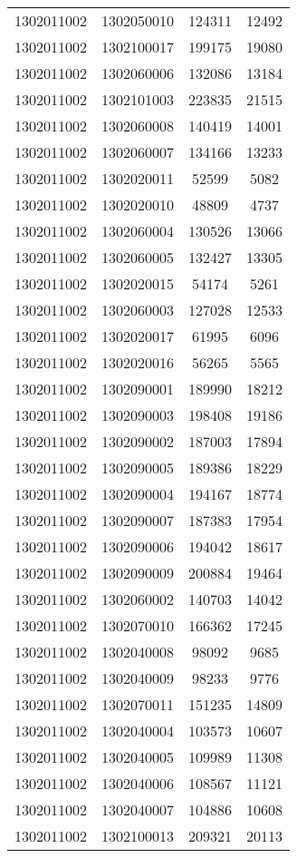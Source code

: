 \begin{longtable}{llcc}
1302011002 & 1302050010 & 124311 & 12492\\
1302011002 & 1302100017 & 199175 & 19080\\
1302011002 & 1302060006 & 132086 & 13184\\
1302011002 & 1302101003 & 223835 & 21515\\
1302011002 & 1302060008 & 140419 & 14001\\
1302011002 & 1302060007 & 134166 & 13233\\
1302011002 & 1302020011 & 52599 & 5082\\
1302011002 & 1302020010 & 48809 & 4737\\
1302011002 & 1302060004 & 130526 & 13066\\
1302011002 & 1302060005 & 132427 & 13305\\
1302011002 & 1302020015 & 54174 & 5261\\
1302011002 & 1302060003 & 127028 & 12533\\
1302011002 & 1302020017 & 61995 & 6096\\
1302011002 & 1302020016 & 56265 & 5565\\
1302011002 & 1302090001 & 189990 & 18212\\
1302011002 & 1302090003 & 198408 & 19186\\
1302011002 & 1302090002 & 187003 & 17894\\
1302011002 & 1302090005 & 189386 & 18229\\
1302011002 & 1302090004 & 194167 & 18774\\
1302011002 & 1302090007 & 187383 & 17954\\
1302011002 & 1302090006 & 194042 & 18617\\
1302011002 & 1302090009 & 200884 & 19464\\
1302011002 & 1302060002 & 140703 & 14042\\
1302011002 & 1302070010 & 166362 & 17245\\
1302011002 & 1302040008 & 98092 & 9685\\
1302011002 & 1302040009 & 98233 & 9776\\
1302011002 & 1302070011 & 151235 & 14809\\
1302011002 & 1302040004 & 103573 & 10607\\
1302011002 & 1302040005 & 109989 & 11308\\
1302011002 & 1302040006 & 108567 & 11121\\
1302011002 & 1302040007 & 104886 & 10608\\
1302011002 & 1302100013 & 209321 & 20113\\

\end{longtable}
